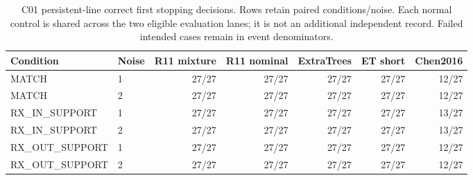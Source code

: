 \begin{table}[t]\centering\small
\caption{C01 persistent-line correct first stopping decisions. Rows retain paired conditions/noise. Each normal control is shared across the two eligible evaluation lanes; it is not an additional independent record. Failed intended cases remain in event denominators.}
\label{tab:c01-persistent-line}
\begin{tabular}{llrrrrr}
\toprule
Condition & Noise & R11 mixture & R11 nominal & ExtraTrees & ET short & Chen2016\\\midrule
MATCH & 1 & 27/27 & 27/27 & 27/27 & 27/27 & 12/27\\
MATCH & 2 & 27/27 & 27/27 & 27/27 & 27/27 & 12/27\\
RX\_IN\_SUPPORT & 1 & 27/27 & 27/27 & 27/27 & 27/27 & 13/27\\
RX\_IN\_SUPPORT & 2 & 27/27 & 27/27 & 27/27 & 27/27 & 13/27\\
RX\_OUT\_SUPPORT & 1 & 27/27 & 27/27 & 27/27 & 27/27 & 12/27\\
RX\_OUT\_SUPPORT & 2 & 27/27 & 27/27 & 27/27 & 27/27 & 12/27\\
\bottomrule\end{tabular}\end{table}
